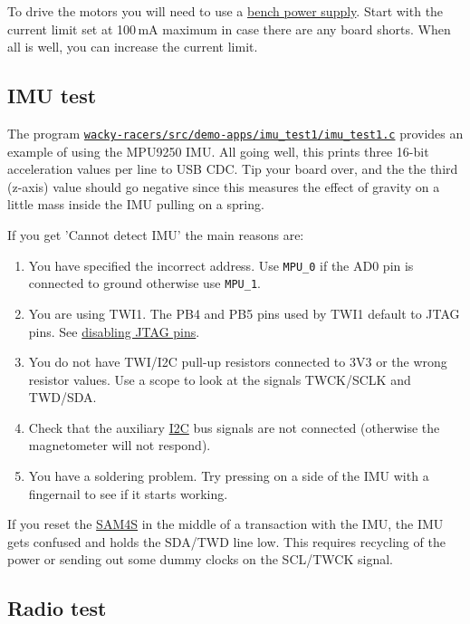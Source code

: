 To drive the motors you will need to use a
\href{bench_power_supply}{bench power supply}. Start with the current
limit set at 100\,mA maximum in case there are any board shorts.
When all is well, you can increase the current limit.

\subsection{IMU test}
\label{imu-test}

The program
\href{https://eng-git.canterbury.ac.nz/mph/wacky-racers-2021/blob/master/src/demo-apps/imu_test1/imu_test1.c}{\texttt{wacky-racers/src/demo-apps/imu\_test1/imu\_test1.c}}
provides an example of using the MPU9250 IMU. All going well, this
prints three 16-bit acceleration values per line to USB CDC. Tip your
board over, and the the third (z-axis) value should go negative since
this measures the effect of gravity on a little mass inside the IMU
pulling on a spring.

If you get 'Cannot detect IMU' the main reasons are:

\begin{enumerate}
\item
  You have specified the incorrect address. Use \texttt{MPU\_0} if the
  AD0 pin is connected to ground otherwise use \texttt{MPU\_1}.
\item
  You are using TWI1. The PB4 and PB5 pins used by TWI1 default to JTAG
  pins. See \protect\hyperref[disabling-jtag-pins]{disabling JTAG pins}.
\item
  You do not have TWI/I2C pull-up resistors connected to 3V3 or the
  wrong resistor values. Use a scope to look at the signals TWCK/SCLK
  and TWD/SDA.
\item
  Check that the auxiliary \url{I2C} bus signals are not connected
  (otherwise the magnetometer will not respond).  
\item
  You have a soldering problem. Try pressing on a side of the IMU with a
  fingernail to see if it starts working.
\end{enumerate}

If you reset the \url{SAM4S} in the middle of a transaction with the
IMU, the IMU gets confused and holds the SDA/TWD line low. This requires
recycling of the power or sending out some dummy clocks on the SCL/TWCK
signal.


\subsection{Radio test}
\label{radio-test}

